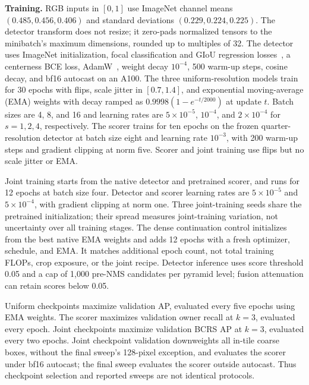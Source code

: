 \documentclass[conference]{IEEEtran}
\begin{document}
\textbf{Training.} RGB inputs in $[0,1]$ use ImageNet channel means $(0.485,0.456,0.406)$ and standard deviations $(0.229,0.224,0.225)$. The detector transform does not resize; it zero-pads normalized tensors to the minibatch's maximum dimensions, rounded up to multiples of 32. The detector uses ImageNet initialization, focal classification and GIoU regression losses~\cite{lin2017focal,rezatofighi2019giou}, a centerness BCE loss, AdamW~\cite{loshchilov2019adamw}, weight decay $10^{-4}$, 500 warm-up steps, cosine decay, and bf16 autocast on an A100. The three uniform-resolution models train for 30 epochs with flips, scale jitter in $[0.7,1.4]$, and exponential moving-average (EMA) weights with decay ramped as $0.9998(1-e^{-t/2000})$ at update $t$. Batch sizes are 4, 8, and 16 and learning rates are $5\times10^{-5}$, $10^{-4}$, and $2\times10^{-4}$ for $s=1,2,4$, respectively. The scorer trains for ten epochs on the frozen quarter-resolution detector at batch size eight and learning rate $10^{-3}$, with 200 warm-up steps and gradient clipping at norm five. Scorer and joint training use flips but no scale jitter or EMA.

Joint training starts from the native detector and pretrained scorer, and runs for 12 epochs at batch size four. Detector and scorer learning rates are $5\times10^{-5}$ and $5\times10^{-4}$, with gradient clipping at norm one. Three joint-training seeds share the pretrained initialization; their spread measures joint-training variation, not uncertainty over all training stages. The dense continuation control initializes from the best native EMA weights and adds 12 epochs with a fresh optimizer, schedule, and EMA. It matches additional epoch count, not total training FLOPs, crop exposure, or the joint recipe. Detector inference uses score threshold 0.05 and a cap of 1{,}000 pre-NMS candidates per pyramid level; fusion attenuation can retain scores below 0.05.

Uniform checkpoints maximize validation AP, evaluated every five epochs using EMA weights. The scorer maximizes validation owner recall at $k=3$, evaluated every epoch. Joint checkpoints maximize validation BCRS AP at $k=3$, evaluated every two epochs. Joint checkpoint validation downweights all in-tile coarse boxes, without the final sweep's 128-pixel exception, and evaluates the scorer under bf16 autocast; the final sweep evaluates the scorer outside autocast. Thus checkpoint selection and reported sweeps are not identical protocols.
\end{document}
